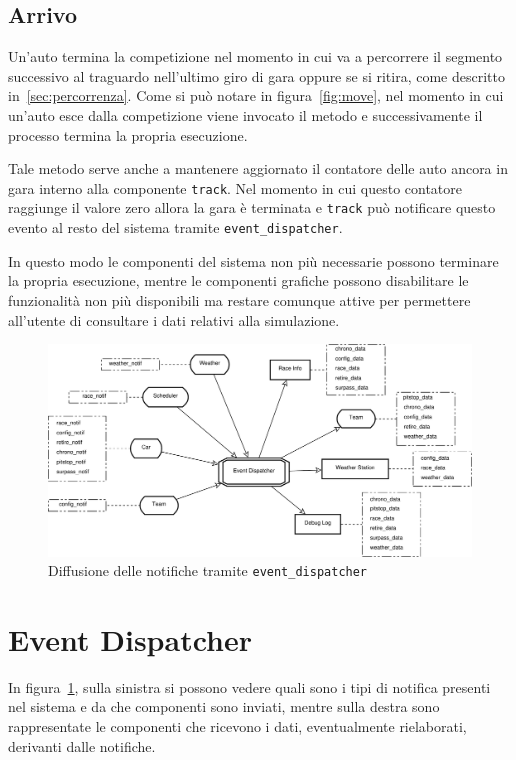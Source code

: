 \subsection{Arrivo}
Un'auto termina la competizione nel momento in cui va a percorrere il segmento successivo al traguardo nell'ultimo giro di gara oppure se si ritira, come descritto in~\ref{sec:percorrenza}. Come si può notare in figura~\ref{fig:move}, nel momento in cui un'auto esce dalla competizione viene invocato il metodo  e successivamente il processo termina la propria esecuzione.

Tale metodo serve anche a mantenere aggiornato il contatore delle auto ancora in gara interno alla componente \texttt{track}. Nel momento in cui questo contatore raggiunge il valore zero allora la gara è terminata e \texttt{track} può notificare questo evento al resto del sistema tramite \texttt{event\_dispatcher}.

In questo modo le componenti del sistema non più necessarie possono terminare la propria esecuzione, mentre le componenti grafiche possono disabilitare le funzionalità non più disponibili ma restare comunque attive per permettere all'utente di consultare i dati relativi alla simulazione.

\begin{landscape}
\begin{figure}
\includegraphics[width=0.75\paperheight]{diagrammi/NotifFlow}
\caption{Diffusione delle notifiche tramite \texttt{event\_dispatcher}}
\label{fig:notifFlow}
\end{figure}
\end{landscape}

\section{Event Dispatcher}
\label{sec:event_dispatcher}
In figura~\ref{fig:notifFlow}, sulla sinistra si possono vedere quali sono i tipi di notifica presenti nel sistema e da che componenti sono inviati, mentre sulla destra sono rappresentate le componenti che ricevono i dati, eventualmente rielaborati, derivanti dalle notifiche.


